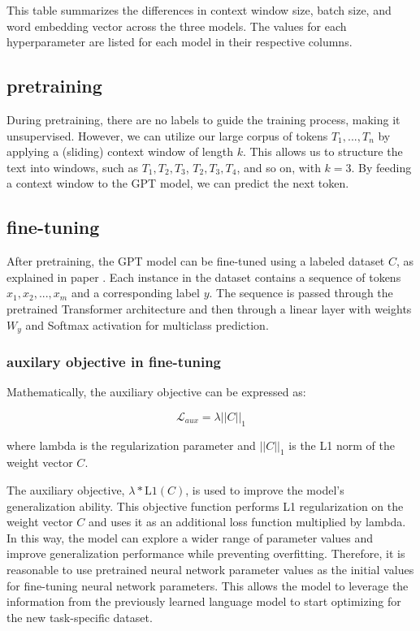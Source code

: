 \documentclass[
	11pt,
	a4paper,
	figtabcapt,
]{oblivoir}
\begin{document}
	This table summarizes the differences in context window size, batch size, and word embedding vector across the three models. The values for each hyperparameter are listed for each model in their respective columns.

\subsection{pretraining}
During pretraining, there are no labels to guide the training process, making it unsupervised.
However, we can utilize our large corpus of tokens $T_1, ..., T_n$ by applying a (sliding) context window of length $k$.
This allows us to structure the text into windows, such as $T_1, T_2, T_3$, $T_2, T_3, T_4$, and so on, with $k=3$.
By feeding a context window to the GPT model, we can predict the next token.


\subsection{fine-tuning}
After pretraining, the GPT model can be fine-tuned using a labeled dataset $C$,
as explained in paper \cite{radford2018improving}.
Each instance in the dataset contains a sequence of tokens $x_1, x_2, ..., x_m$ and a corresponding label $y$.
The sequence is passed through the pretrained Transformer architecture
and then through a linear layer with weights $W_y$ and Softmax activation for multiclass prediction.

\subsubsection{auxilary objective in fine-tuning}
Mathematically, the auxiliary objective can be expressed as:

\begin{equation}
\mathcal{L}_{aux} = \lambda ||C||_1
\end{equation}

where lambda is the regularization parameter and $||C||_1$ is the L1 norm of the weight vector $C$.

The auxiliary objective, $\lambda * \text{L1}(C)$, is used to improve the model's generalization ability.
This objective function performs L1 regularization on the weight vector $C$
and uses it as an additional loss function multiplied by lambda.
In this way, the model can explore a wider range of parameter values
and improve generalization performance while preventing overfitting.
Therefore, it is reasonable to use pretrained neural network parameter values
as the initial values for fine-tuning neural network parameters.
This allows the model to leverage the information from the previously learned language model
to start optimizing for the new task-specific dataset. 


\clearpage
\end{document}
